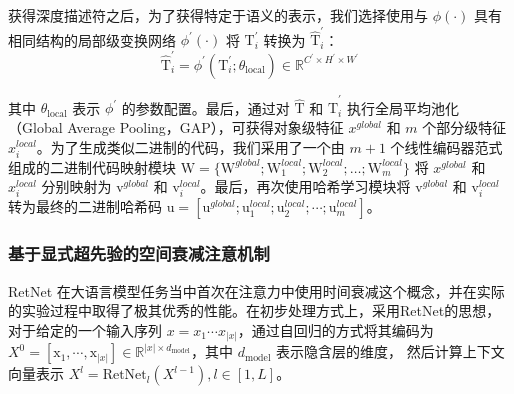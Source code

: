 获得深度描述符之后，为了获得特定于语义的表示，我们选择使用与 $\phi(\cdot)$ 具有相同结构的局部级变换网络 $\phi^{\prime}(\cdot)$ 将 $\mathrm{T}_i^{\prime}$ 转换为 $\hat{\mathrm{T}}_i^{\prime}$：
\begin{equation}
    \hat{\mathrm{T}}_i^{\prime}=\phi^{\prime}(\mathrm{T}_i^{\prime};\theta_{\mathrm{local}})\in\mathbb{R}^{C^{\prime}\times H^{\prime}\times W^{\prime}}
\end{equation}

其中 $\theta_{\mathrm{local}}$ 表示 $\phi^{\prime}$ 的参数配置。最后，通过对 $\hat{\mathrm{T}}$ 和 $\hat{\mathrm{T}}_i^{\prime}$ 执行全局平均池化（Global Average Pooling，GAP），可获得对象级特征 $x^{global}$ 和 $m$ 个部分级特征 $x^{local}_i$。为了生成类似二进制的代码，我们采用了一个由 $m + 1$ 个线性编码器范式组成的二进制代码映射模块 $\mathrm{W}=\{\mathrm{W}^{global};\mathrm{W}_1^{local};\mathrm{W}_2^{local};\ldots;\mathrm{W}_m^{local}\}$ 将 $x^{global}$ 和 $x_i^{local}$ 分别映射为 $\mathrm{v}^{global}$ 和 $\mathrm{v}_i^{local}$。最后，再次使用哈希学习模块将 $\mathrm{v}^{global}$ 和 $\mathrm{v}_i^{local}$ 转为最终的二进制哈希码 $\mathrm{u}=[\mathrm{u}^{global};\mathrm{u}_1^{local};\mathrm{u}_2^{local};\cdots;\mathrm{u}_m^{local}]$。

\subsubsection{基于显式超先验的空间衰减注意机制}

RetNet \cite{sun2023retentive} 在大语言模型任务当中首次在注意力中使用时间衰减这个概念，并在实际的实验过程中取得了极其优秀的性能。在初步处理方式上，采用RetNet的思想，对于给定的一个输入序列 $x=x_{1}\cdots x_{|x|}$，通过自回归的方式将其编码为 $X^0 = [\mathrm{x}_1,\cdots,\mathrm{x}_{|x|}] \in \mathbb{R}^{|x|\times d_{\mathrm{model}}}$，其中 $d_{\mathrm{model}}$ 表示隐含层的维度， 然后计算上下文向量表示 $X^l=\mathrm{RetNet}_l(X^{l-1}),l\in[1,L]$。

